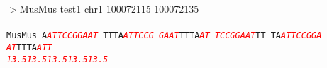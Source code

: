 \documentclass[11pt,twoside,reqno,a4paper]{article}
\begin{document}
\noindent
\newlength{\charwidth}$>$MusMus	test1	chr1	100072115	100072135 \\
 \\
\texttt{MusMus	A\textit{\textcolor{red}{A}}\textit{\textcolor{red}{T}}\textit{\textcolor{red}{T}}\textit{\textcolor{red}{C}}\textit{\textcolor{red}{C}}\textit{\textcolor{red}{G}}\textit{\textcolor{red}{G}}\textit{\textcolor{red}{A}}\textit{\textcolor{red}{A}}\textit{\textcolor{red}{T}}	TTTA\textit{\textcolor{red}{A}}\textit{\textcolor{red}{T}}\textit{\textcolor{red}{T}}\textit{\textcolor{red}{C}}\textit{\textcolor{red}{C}}\textit{\textcolor{red}{G}}	\textit{\textcolor{red}{G}}\textit{\textcolor{red}{A}}\textit{\textcolor{red}{A}}\textit{\textcolor{red}{T}}TTTA\textit{\textcolor{red}{A}}\textit{\textcolor{red}{T}}	\textit{\textcolor{red}{T}}\textit{\textcolor{red}{C}}\textit{\textcolor{red}{C}}\textit{\textcolor{red}{G}}\textit{\textcolor{red}{G}}\textit{\textcolor{red}{A}}\textit{\textcolor{red}{A}}\textit{\textcolor{red}{T}}TT	TA\textit{\textcolor{red}{A}}\textit{\textcolor{red}{T}}\textit{\textcolor{red}{T}}\textit{\textcolor{red}{C}}\textit{\textcolor{red}{C}}\textit{\textcolor{red}{G}}\textit{\textcolor{red}{G}}\textit{\textcolor{red}{A}}	\textit{\textcolor{red}{A}}\textit{\textcolor{red}{T}}TTTA\textit{\textcolor{red}{A}}\textit{\textcolor{red}{T}}\textit{\textcolor{red}{T}}\\
\hspace*{7\charwidth}\hspace*{1\charwidth}\textit{\textcolor{red}{13.5}}\hspace*{1\charwidth}\hspace*{10\charwidth}\textit{\textcolor{red}{13.5}}\hspace*{1\charwidth}\hspace*{10\charwidth}\textit{\textcolor{red}{13.5}}\hspace*{1\charwidth}\hspace*{1\charwidth}\hspace*{10\charwidth}\textit{\textcolor{red}{13.5}}\hspace*{1\charwidth}\hspace*{10\charwidth}\textit{\textcolor{red}{13.5}}\hspace*{1\charwidth}\\
}
\end{document}
